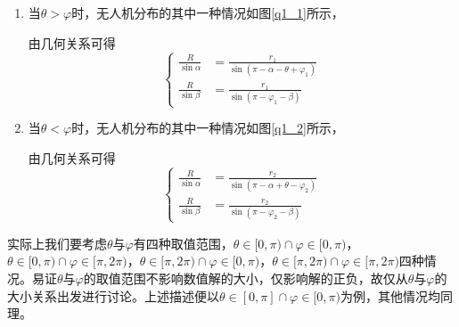 \documentclass[withoutpreface,bwprint]{cumcmthesis} %
\begin{document}
\begin{enumerate}
    \item 当$\theta>\varphi$时，无人机分布的其中一种情况如图\ref{q1_1}所示，

    由几何关系可得
    \begin{equation}
    \left\{
    \begin{aligned}
        \frac{R}{\sin\alpha} &= \frac{r_1}{\sin(\pi - \alpha - \theta + \varphi_1)} \\
        \frac{R}{\sin\beta} &= \frac{r_1}{\sin(\pi - \varphi_1 - \beta)}
    \end{aligned}
    \right.
    \label{式1}
    \end{equation}

    \item 当$\theta<\varphi$时，无人机分布的其中一种情况如图\ref{q1_2}所示，
    
    由几何关系可得
    \begin{equation}
    \left\{
        \begin{aligned}
            \frac{R}{\sin\alpha} &= \frac{r_2}{\sin(\pi - \alpha + \theta - \varphi_2)} \\
            \frac{R}{\sin\beta} &= \frac{r_2}{\sin(\pi - \varphi_2 - \beta)}
        \end{aligned}
    \right.
    \label{式2}
    \end{equation}
    
\end{enumerate}


实际上我们要考虑$\theta$与$\varphi$有四种取值范围，$\theta \in[0,\pi)\cap \varphi \in[0,\pi)$，$\theta \in[0,\pi)\cap \varphi \in[\pi,2\pi)$，$\theta \in[\pi,2\pi)\cap \varphi \in[0,\pi)$，$\theta \in[\pi,2\pi)\cap \varphi \in[\pi,2\pi)$四种情况。易证$\theta$与$\varphi$的取值范围不影响数值解的大小，仅影响解的正负，故仅从$\theta$与$\varphi$的大小关系出发进行讨论。上述描述便以$\theta \in[0,\pi]\cap \varphi \in[0,\pi)$为例，其他情况均同理。
\end{document}
